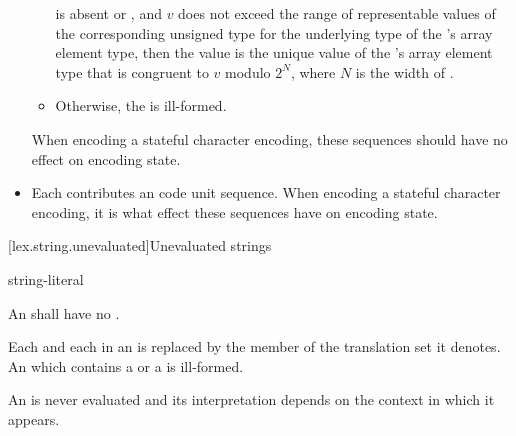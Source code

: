 \documentclass{wg21}
\begin{document}
\begin{itemize}
\begin{itemize}
        is absent or , and
        $v$ does not exceed the range of representable values of
        the corresponding unsigned type for the underlying type of
        the 's array element type,
        then the value is the unique value of
        the 's array element type 
        that is congruent to $v$ modulo $2^N$, where $N$ is the width of .
        \item
        Otherwise, the  is ill-formed.
    \end{itemize}
    When encoding a stateful character encoding,
    these sequences should have no effect on encoding state.
    \item
    Each 
    contributes an
    code unit sequence.
    When encoding a stateful character encoding,
    it is
    what effect these sequences have on encoding state.
\end{itemize}


\begin{addedblock}

[lex.string.unevaluated]{Unevaluated strings}

\begin{bnf}
    \br
    string-literal
\end{bnf}

An  shall have no  .

Each  and each  in an  is replaced by the member of the translation set it denotes.
An  which contains a 
or a  is ill-formed.

An  is never evaluated and its interpretation depends on the context in which it appears.
\end{addedblock}
\end{document}
